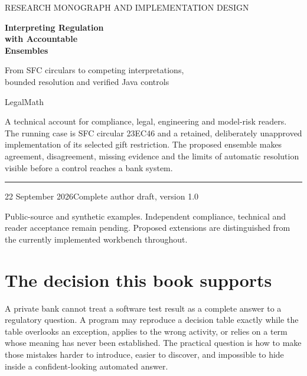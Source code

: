 \documentclass[12pt,a4paper,oneside,openany]{book}
\begin{document}
\frontmatter
\hypersetup{pageanchor=false}
\begin{titlepage}
\vspace*{15mm}
{\sffamily\color{teal}\large RESEARCH MONOGRAPH AND IMPLEMENTATION DESIGN\par}
\vspace{12mm}
{\sffamily\bfseries\color{navy}\fontsize{32}{37}\selectfont Interpreting Regulation\\with Accountable\\Ensembles\par}
\vspace{12mm}
{\Large From SFC circulars to competing interpretations,\\bounded resolution and verified Java controls\par}
\vspace{12mm}
{\large LegalMath\par}
\vfill
\begin{minipage}{0.94\textwidth}
A technical account for compliance, legal, engineering and model-risk readers.
The running case is SFC circular 23EC46 and a retained, deliberately unapproved
implementation of its selected gift restriction. The proposed ensemble makes
agreement, disagreement, missing evidence and the limits of automatic resolution
visible before a control reaches a bank system.
\end{minipage}
\vspace{16mm}
\hrule
\vspace{5mm}
22 September 2026\hfill Complete author draft, version 1.0\par
\small Public-source and synthetic examples. Independent compliance, technical
and reader acceptance remain pending. Proposed extensions are distinguished
from the currently implemented workbench throughout.
\end{titlepage}
\hypersetup{pageanchor=true}
\chapter*{The decision this book supports}
A private bank cannot treat a software test result as a complete answer to a
regulatory question. A program may reproduce a decision table exactly while the
table overlooks an exception, applies to the wrong activity, or relies on a term
whose meaning has never been established. The practical question is how to make
those mistakes harder to introduce, easier to discover, and impossible to hide
inside a confident-looking automated answer.
\end{document}

